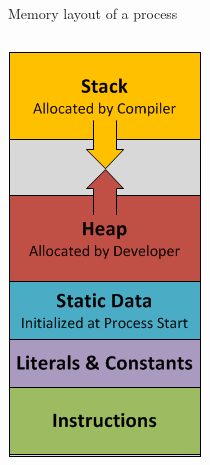 \begin{frame}{Memory layout of a process}
\begin{columns}
    \begin{column}{.3\textwidth}
      \centering\includegraphics[height=.5\textheight]{images/process-memory-layout}
    \end{column}
  \end{columns}

\end{frame}

